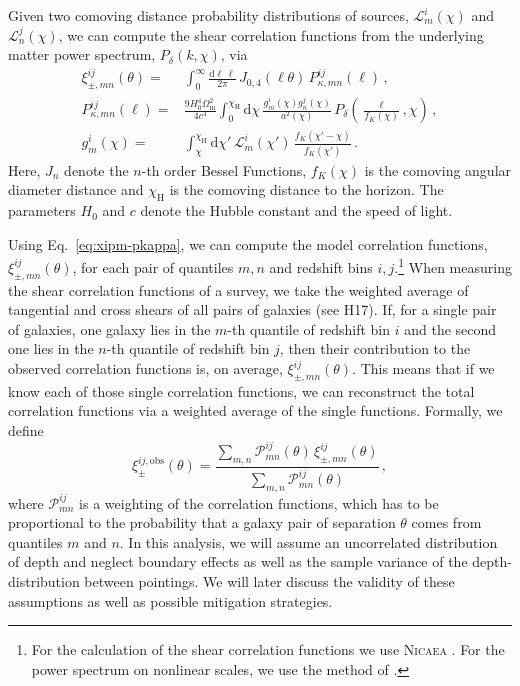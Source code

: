 \documentclass{aa}
\renewcommand{\rm}{\mathrm}
\begin{document}
Given two comoving distance probability distributions of sources, $\mathcal{L}^i_m(\chi)$ and $\mathcal{L}^j_n(\chi)$, we can compute the shear correlation functions from the underlying matter power spectrum, $P_\delta(k,\chi)$, via \citep{1992ApJ...388..272K} \begin{align}
\label{eq:xipm-pkappa}
\xi_{\pm,mn}^{ij}(\theta) =& \int_0^\infty \frac{{\rm d}\ell\,\ell}{2\pi}\, J_{0,4}(\ell\theta)\, P^{ij}_{\kappa,mn}(\ell)\, , \\
\label{eq:pkappa-pdelta/lenseff}
P^{ij}_{\kappa,mn}(\ell) =& \frac{9 H_0^4\Omega_{\rm m}^2}{4c^4}\int_0^{\chi_{\rm{H}}} {\rm d}\chi\, \frac{g^i_m(\chi)g^j_n(\chi)}{a^2(\chi)}\, P_\delta\left(\frac{\ell}{f_K(\chi)},\chi\right)\, , \\
\label{eq:lenseff}
g^i_m(\chi) =& \int_\chi^{\chi_{\rm{H}}} {\rm d}\chi' \, \mathcal{L}^i_m(\chi') \, \frac{f_K(\chi'-\chi)}{f_K(\chi')}\, .
\end{align}
Here, $J_n$ denote the $n$-th order Bessel Functions, $f_K(\chi)$ is the comoving angular diameter distance and $\chi_{\rm{H}}$ is the comoving distance to the horizon. The parameters $H_0$ and $c$ denote the Hubble constant and the speed of light.

Using Eq.~\eqref{eq:xipm-pkappa}, we can compute the model correlation functions, $\xi_{\pm,mn}^{ij}(\theta)$, for each pair of quantiles $m,n$ and redshift bins $i,j$.\footnote{For the calculation of the shear correlation functions we use \textsc{Nicaea} \citep{2009A&A...497..677K}. %
For the power spectrum on nonlinear scales, we use the method of \citet{2012ApJ...761..152T}.} When measuring the shear correlation functions of a survey, we take the weighted average of tangential and cross shears of all pairs of galaxies (see H17). If, for a single pair of galaxies, one galaxy lies in the $m$-th quantile of redshift bin $i$ and the second one lies in the $n$-th quantile of redshift bin $j$, then their contribution to the observed correlation functions is, on average, $\xi_{\pm,mn}^{ij}(\theta)$. This means that if we know each of those single correlation functions, we can reconstruct the total correlation functions via a weighted average of the single functions. Formally, we define \begin{equation}
\xi_\pm^{ij,\rm{obs}}(\theta) = \frac{\sum_{m,n} \mathcal{P}_{mn}^{ij}(\theta)\,\xi_{\pm,mn}^{ij}(\theta)}{\sum_{m,n} \mathcal{P}_{mn}^{ij}(\theta)}\, ,
\label{eq:def_xiobs}
\end{equation}
where $\mathcal{P}_{mn}^{ij}$ is a weighting of the correlation functions, which has to be proportional to the probability that a galaxy pair of separation $\theta$ comes from quantiles $m$ and $n$. In this analysis, we will assume an uncorrelated distribution of depth and neglect boundary effects as well as the sample variance of the depth-distribution between pointings. We will later discuss the validity of these assumptions as well as possible mitigation strategies. 
\end{document}
